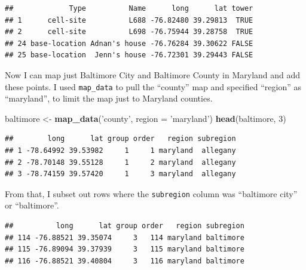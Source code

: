 \documentclass[]{book}
\makeatletter
\newenvironment{Shaded}{\begin{snugshade}}{\end{snugshade}}
\newcommand{\KeywordTok}[1]{\textcolor[rgb]{0.13,0.29,0.53}{\textbf{#1}}}
\newcommand{\DataTypeTok}[1]{\textcolor[rgb]{0.13,0.29,0.53}{#1}}
\newcommand{\DecValTok}[1]{\textcolor[rgb]{0.00,0.00,0.81}{#1}}
\newcommand{\StringTok}[1]{\textcolor[rgb]{0.31,0.60,0.02}{#1}}
\newcommand{\OperatorTok}[1]{\textcolor[rgb]{0.81,0.36,0.00}{\textbf{#1}}}
\newcommand{\NormalTok}[1]{#1}
\newenvironment{kframe}{%
\medskip{}
\setlength{\fboxsep}{.8em}
 \def\at@end@of@kframe{}%
 \ifinner\ifhmode%
  \def\at@end@of@kframe{\end{minipage}}%
  \begin{minipage}{\columnwidth}%
 \fi\fi%
 \def\FrameCommand##1{\hskip\@totalleftmargin \hskip-\fboxsep
 \colorbox{shadecolor}{##1}\hskip-\fboxsep
     \hskip-\linewidth \hskip-\@totalleftmargin \hskip\columnwidth}%
 \MakeFramed {\advance\hsize-\width
   \@totalleftmargin\z@ \linewidth\hsize
   \@setminipage}}%
 {\par\unskip\endMakeFramed%
 \at@end@of@kframe}
\renewenvironment{Shaded}{\begin{kframe}}{\end{kframe}}
\theoremstyle{definition}
\theoremstyle{definition}
\theoremstyle{definition}
\theoremstyle{remark}
\makeatother
\begin{document}
\begin{verbatim}
##             Type          Name      long      lat tower
## 1      cell-site          L688 -76.82480 39.29813  TRUE
## 2      cell-site          L698 -76.75944 39.28758  TRUE
## 24 base-location Adnan's house -76.76284 39.30622 FALSE
## 25 base-location  Jenn's house -76.72301 39.29443 FALSE
\end{verbatim}

Now I can map just Baltimore City and Baltimore County in Maryland and
add these points. I used \texttt{map\_data} to pull the ``county'' map
and specified ``region'' as ``maryland'', to limit the map just to
Maryland counties.

\begin{Shaded}
\begin{Highlighting}[]
\NormalTok{baltimore <-}\StringTok{ }\KeywordTok{map_data}\NormalTok{(}\StringTok{'county'}\NormalTok{, }\DataTypeTok{region =} \StringTok{'maryland'}\NormalTok{)}
\KeywordTok{head}\NormalTok{(baltimore, }\DecValTok{3}\NormalTok{)}
\end{Highlighting}
\end{Shaded}

\begin{verbatim}
##        long      lat group order   region subregion
## 1 -78.64992 39.53982     1     1 maryland  allegany
## 2 -78.70148 39.55128     1     2 maryland  allegany
## 3 -78.74159 39.57420     1     3 maryland  allegany
\end{verbatim}

From that, I subset out rows where the \texttt{subregion} column was
``baltimore city'' or ``baltimore''.

\begin{Shaded}
\end{Shaded}

\begin{verbatim}
##          long      lat group order   region subregion
## 114 -76.88521 39.35074     3   114 maryland baltimore
## 115 -76.89094 39.37939     3   115 maryland baltimore
## 116 -76.88521 39.40804     3   116 maryland baltimore
\end{verbatim}
\end{document}
